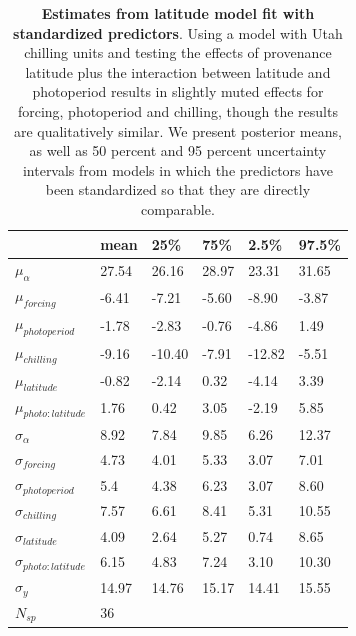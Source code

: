 \documentclass{article}
\begin{document}
\begin{footnotesize}
\begin{table}[ht]
\centering
\caption{\textbf{Estimates from latitude model fit with standardized predictors}. Using a model with Utah chilling units and testing the effects of provenance latitude plus the interaction between latitude and photoperiod results in slightly muted effects for forcing, photoperiod and chilling, though the results are qualitatively similar. We present posterior means, as well as 50 percent and 95 percent uncertainty intervals from models in which the predictors have been standardized so that they are directly comparable.} 
\label{tab:lat}
\begingroup\footnotesize
\begin{tabular}{|p{}|p{}p{}p{}p{}p{}|}
  \hline
 & mean & 25\% & 75\% & 2.5\% & 97.5\% \\ 
  \hline
$\mu_{\alpha}$ & 27.54 & 26.16 & 28.97 & 23.31 & 31.65 \\ 
  $\mu_{forcing}$ & -6.41 & -7.21 & -5.60 & -8.90 & -3.87 \\ 
  $\mu_{photoperiod}$ & -1.78 & -2.83 & -0.76 & -4.86 & 1.49 \\ 
  $\mu_{chilling}$ & -9.16 & -10.40 & -7.91 & -12.82 & -5.51 \\ 
  $\mu_{latitude}$ & -0.82 & -2.14 & 0.32 & -4.14 & 3.39 \\ 
  $\mu_{photo:latitude}$ & 1.76 & 0.42 & 3.05 & -2.19 & 5.85 \\ 
  $\sigma_{\alpha}$ & 8.92 & 7.84 & 9.85 & 6.26 & 12.37 \\ 
  $\sigma_{forcing}$ & 4.73 & 4.01 & 5.33 & 3.07 & 7.01 \\ 
  $\sigma_{photoperiod}$ & 5.4 & 4.38 & 6.23 & 3.07 & 8.60 \\ 
  $\sigma_{chilling}$ & 7.57 & 6.61 & 8.41 & 5.31 & 10.55 \\ 
  $\sigma_{latitude}$ & 4.09 & 2.64 & 5.27 & 0.74 & 8.65 \\ 
  $\sigma_{photo:latitude}$ & 6.15 & 4.83 & 7.24 & 3.10 & 10.30 \\ 
  $\sigma_{y}$ & 14.97 & 14.76 & 15.17 & 14.41 & 15.55 \\ 
   \hline
$N_{sp}$ & 36 &  &  &  &  \\ 
   \hline
\end{tabular}
\endgroup
\end{table}



\end{footnotesize}
\end{document}
